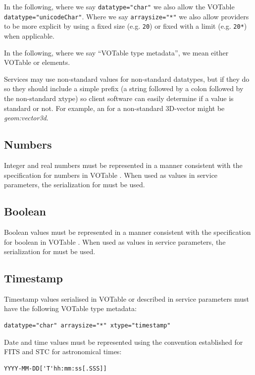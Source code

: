 \documentclass[11pt,letter]{ivoa}
\begin{document}
In the following, where we say \verb|datatype="char"| we also allow the VOTable
\verb|datatype="unicodeChar"|. Where we say \verb|arraysize="*"| we also allow
providers to be more explicit by using a fixed size (e.g. \verb|20|) or fixed
with a limit (e.g. \verb|20*|) when applicable.

In the following, where we say ``VOTable type metadata'', we mean either VOTable
 or  elements.

Services may use non-standard  values for non-standard datatypes, but if they
do so they should include a simple prefix (a string followed by a colon
followed by the non-standard xtype) so client software can easily determine
if a value is standard or not. For example, an  for a
non-standard 3D-vector might be \emph{geom:vector3d}.

\subsection{Numbers}
Integer and real numbers must be represented in a manner consistent with the
specification for numbers in VOTable \citep{2019ivoa.spec.1021O}.  When used as
values in service parameters, the serialization for  must be used.

\subsection{Boolean}
Boolean values must be represented in a manner consistent with the
specification for boolean in VOTable \citep{2019ivoa.spec.1021O}. When used as
values in service parameters, the serialization for  must be used.

\subsection{Timestamp}
Timestamp values serialised in VOTable or described in service parameters must have
the following VOTable type metadata:

\begin{verbatim}
datatype="char" arraysize="*" xtype="timestamp"
\end{verbatim}

\noindent
Date and time values must be represented  using the convention established for
FITS \citep{std:FITS} and STC \citep{2007ivoa.spec.1030R} for astronomical times:

\begin{verbatim}
YYYY-MM-DD['T'hh:mm:ss[.SSS]]
\end{verbatim}
\end{document}
